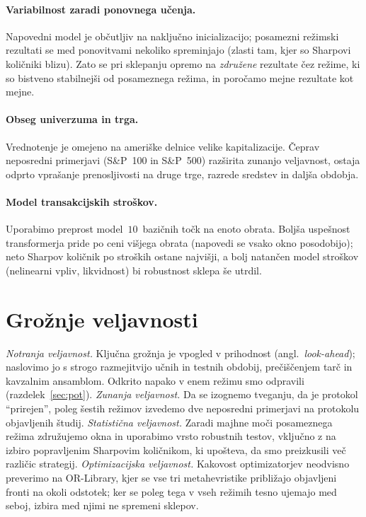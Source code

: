 \paragraph{Variabilnost zaradi ponovnega učenja.} Napovedni model je občutljiv na naključno inicializacijo; posamezni režimski rezultati se med ponovitvami nekoliko spreminjajo (zlasti tam, kjer so Sharpovi količniki blizu). Zato se pri sklepanju opremo na \emph{združene} rezultate čez režime, ki so bistveno stabilnejši od posameznega režima, in poročamo mejne rezultate kot mejne.

\paragraph{Obseg univerzuma in trga.} Vrednotenje je omejeno na ameriške delnice velike kapitalizacije. Čeprav neposredni primerjavi (S\&P~100 in S\&P~500) razširita zunanjo veljavnost, ostaja odprto vprašanje prenosljivosti na druge trge, razrede sredstev in daljša obdobja.

\paragraph{Model transakcijskih stroškov.} Uporabimo preprost model~$10$~bazičnih točk na enoto obrata. Boljša uspešnost transformerja pride po ceni višjega obrata (napovedi se vsako okno posodobijo); neto Sharpov količnik po stroških ostane najvišji, a bolj natančen model stroškov (nelinearni vpliv, likvidnost) bi robustnost sklepa še utrdil.

\section{Grožnje veljavnosti}
\label{sec:grozbe}

\emph{Notranja veljavnost.} Ključna grožnja je vpogled v prihodnost (angl.\ \emph{look-ahead}); naslovimo jo s strogo razmejitvijo učnih in testnih obdobij, prečiščenjem tarč in kavzalnim ansamblom. Odkrito napako v enem režimu smo odpravili (razdelek~\ref{sec:pot}). \emph{Zunanja veljavnost.} Da se izognemo tveganju, da je protokol ``prirejen'', poleg šestih režimov izvedemo dve neposredni primerjavi na protokolu objavljenih študij. \emph{Statistična veljavnost.} Zaradi majhne moči posameznega režima združujemo okna in uporabimo vrsto robustnih testov, vključno z na izbiro popravljenim Sharpovim količnikom, ki upošteva, da smo preizkusili več različic strategij. \emph{Optimizacijska veljavnost.} Kakovost optimizatorjev neodvisno preverimo na OR-Library, kjer se vse tri metahevristike približajo objavljeni fronti na okoli odstotek; ker se poleg tega v vseh režimih tesno ujemajo med seboj, izbira med njimi ne spremeni sklepov.

